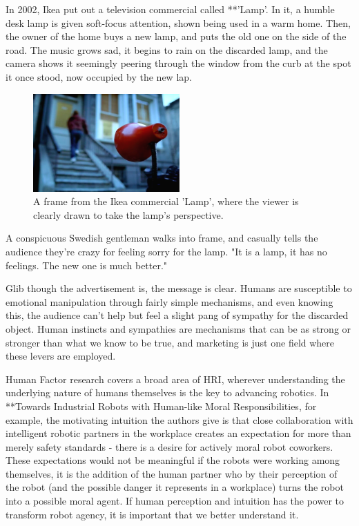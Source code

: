 \documentclass{sfuthesis}
\begin{document}
In 2002, Ikea put out a television commercial called **'Lamp'. In it, a humble desk lamp is given soft-focus attention, shown being used in a warm home. Then, the owner of the home buys a new lamp, and puts the old one on the side of the road. The music grows sad, it begins to rain on the discarded lamp, and the camera shows it seemingly peering through the window from the curb at the spot it once stood, now occupied by the new lap.

\begin{figure}
    \centering
    \includegraphics[width=0.5\textwidth]{ikea.png} 

    \caption{A frame from the Ikea commercial 'Lamp', where the viewer is clearly drawn to take the lamp's perspective.}
    \label{fig:lamp}
\end{figure}

A conspicuous Swedish gentleman walks into frame, and casually tells the audience they're crazy for feeling sorry for the lamp. "It is a lamp, it has no feelings. The new one is much better."

Glib though the advertisement is, the message is clear. Humans are susceptible to emotional manipulation through fairly simple mechanisms, and even knowing this, the audience can't help but feel a slight pang of sympathy for the discarded object. Human instincts and sympathies are mechanisms that can be as strong or stronger than what we know to be true, and marketing is just one field where these levers are employed.

Human Factor research covers a broad area of HRI, wherever understanding the underlying nature of humans themselves is the key to advancing robotics. In **Towards Industrial Robots with Human-like Moral Responsibilities, for example, the motivating intuition the authors give is that close collaboration with intelligent robotic partners in the workplace creates an expectation for more than merely safety standards - there is a desire for actively moral robot coworkers. These expectations would not be meaningful if the robots were working among themselves, it is the addition of the human partner who by their perception of the robot (and the possible danger it represents in a workplace) turns the robot into a possible moral agent. If human perception and intuition has the power to transform robot agency, it is important that we better understand it.
\end{document}
